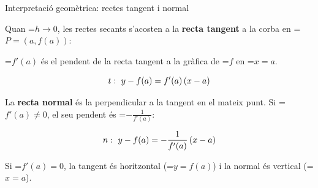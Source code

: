 \documentclass[11pt,a4paper]{article}
\newcommand{\fmm}[1]{\setbox0=\hbox{$#1$}\ifdim\wd0>\linewidth\fmdisp{#1}\else\mbox{\box0}\fi}
\newcommand{\fmdisp}[1]{\[\setbox2=\hbox{$\displaystyle #1$}\ifdim\wd2>\linewidth\resizebox{\linewidth}{!}{\box2}\else\box2\fi\]}
\begin{document}
\begin{fmprop}{Interpretació geomètrica: rectes tangent i normal}
\par\noindent \begin{minipage}[t]{0.48\linewidth}\vspace{0pt}\raggedright Quan \fmm{h\to0}, les rectes secants s'acosten a la \textbf{recta tangent} a la corba en \fmm{P=(a,f(a))}:

\begin{center}\colorbox{fmyellow!45}{\parbox{0.9\linewidth}{\centering\strut \fmm{f'(a)} és el pendent de la recta tangent a la gràfica de \fmm{f} en \fmm{x=a}.\strut}}\end{center}

\fmdisp{t:\ y-f(a)=f'(a)\,(x-a)}

La \textbf{recta normal} és la perpendicular a la tangent en el mateix punt. Si \fmm{f'(a)\neq0}, el seu pendent és \fmm{-\frac{1}{f'(a)}}:

\fmdisp{n:\ y-f(a)=-\frac{1}{f'(a)}\,(x-a)}

Si \fmm{f'(a)=0}, la tangent és horitzontal (\fmm{y=f(a)}) i la normal és vertical (\fmm{x=a}).\end{minipage}\hfill\begin{minipage}[t]{0.48\linewidth}\vspace{0pt}\raggedright \begin{center}\end{center}\end{minipage}\par\medskip
\end{fmprop}
\end{document}
